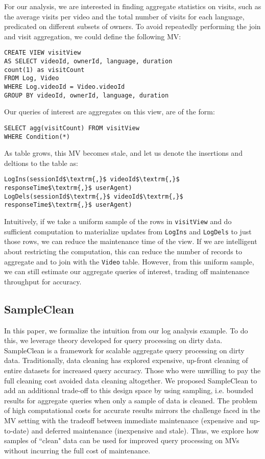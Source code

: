 For our analysis, we are interested in finding aggregate statistics on visits, such as the average visits per video and the total number of visits for each language, predicated on different subsets of owners. 
To avoid repeatedly performing the join and visit aggregation, we could define the following MV:
\begin{lstlisting}[mathescape,basicstyle={\scriptsize}]
CREATE VIEW visitView
AS SELECT videoId, ownerId, language, duration
count(1) as visitCount
FROM Log, Video
WHERE Log.videoId = Video.videoId
GROUP BY videoId, ownerId, language, duration
\end{lstlisting}
Our queries of interest are aggregates on this view, are of the form:
\begin{lstlisting}[mathescape,basicstyle={\scriptsize}]
SELECT agg(visitCount) FROM visitView 
WHERE Condition(*)
\end{lstlisting}

As  table grows, this MV becomes stale, and let us denote the insertions and deltions to the table as:
\begin{lstlisting}[mathescape,basicstyle={\scriptsize}]
LogIns(sessionId$\textrm{,}$ videoId$\textrm{,}$ responseTime$\textrm{,}$ userAgent)
LogDels(sessionId$\textrm{,}$ videoId$\textrm{,}$ responseTime$\textrm{,}$ userAgent)
\end{lstlisting}
Intuitively, if we take a uniform sample of the rows in \texttt{visitView} and do sufficient computation to materialize updates from \texttt{LogIns} and \texttt{LogDels} to just those rows, we can reduce the maintenance time of the view.
If we are intelligent about restricting the computation, this can reduce the number of  records to aggregate and to join with the \texttt{Video} table.
However, from this uniform sample, we can still estimate our aggregate queries of interest, trading off maintenance throughput for accuracy.

\subsection{SampleClean~\cite{wang1999sample}}
In this paper, we formalize the intuition from our log analysis example. 
To do this, we leverage theory developed for query processing on dirty data.
SampleClean is a framework for scalable aggregate query processing on dirty data.
Traditionally, data cleaning has explored expensive, up-front cleaning of entire datasets for increased query accuracy.
Those who were unwilling to pay the full cleaning cost avoided data cleaning altogether.
We proposed SampleClean to add an additional trade-off to this design space by using sampling, i.e. bounded results for aggregate queries when only a sample of data is cleaned.
The problem of high computational costs for accurate results mirrors the challenge faced in the MV setting with the tradeoff between immediate maintenance (expensive and up-to-date) and deferred maintenance (inexpensive and stale). 
Thus, we explore how samples of ``clean" data can be used for improved query processing on MVs without incurring the full cost of maintenance.


